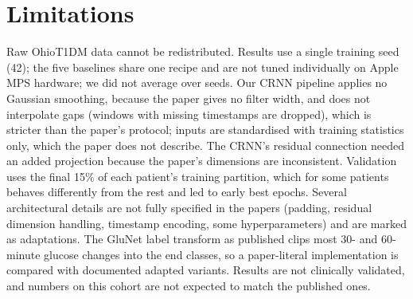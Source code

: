 \documentclass[conference]{IEEEtran}
\begin{document}
\section{Limitations}
Raw OhioT1DM data cannot be redistributed. Results use a single training seed (42); the five baselines share one recipe and are not tuned individually on Apple MPS hardware; we did not average over seeds. Our CRNN pipeline applies no Gaussian smoothing, because the paper gives no filter width, and does not interpolate gaps (windows with missing timestamps are dropped), which is stricter than the paper's protocol; inputs are standardised with training statistics only, which the paper does not describe. The CRNN's residual connection needed an added projection because the paper's dimensions are inconsistent. Validation uses the final 15\% of each patient's training partition, which for some patients behaves differently from the rest and led to early best epochs. Several architectural details are not fully specified in the papers (padding, residual dimension handling, timestamp encoding, some hyperparameters) and are marked as adaptations. The GluNet label transform as published clips most 30- and 60-minute glucose changes into the end classes, so a paper-literal implementation is compared with documented adapted variants. Results are not clinically validated, and numbers on this cohort are not expected to match the published ones.
\end{document}
